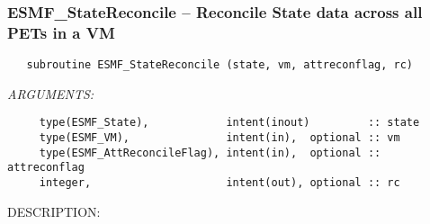  
\setlength{\oldparskip}{\parskip}
\setlength{\parskip}{1.5ex}
\setlength{\oldparindent}{\parindent}
\setlength{\parindent}{0pt}
\setlength{\oldbaselineskip}{\baselineskip}
\setlength{\baselineskip}{11pt}
 
\def\bv{\begin{verbatim}}
\def\ev{\end{verbatim}}
\def\be{\begin{equation}}
\def\ee{\end{equation}}
\def\bea{\begin{eqnarray}}
\def\eea{\end{eqnarray}}
\def\bi{\begin{itemize}}
\def\ei{\end{itemize}}
\def\bn{\begin{enumerate}}
\def\en{\end{enumerate}}
\def\bd{\begin{description}}
\def\ed{\end{description}}
\def\({\left (}
\def\){\right )}
\def\[{\left [}
\def\]{\right ]}
\def\<{\left  \langle}
\def\>{\right \rangle}
\def\cI{{\cal I}}
\def\diag{\mathop{\rm diag}}
\def\tr{\mathop{\rm tr}}


 
\subsubsection [ESMF\_StateReconcile] {ESMF\_StateReconcile -- Reconcile State data across all PETs in a VM}


  
\begin{verbatim}   subroutine ESMF_StateReconcile (state, vm, attreconflag, rc)\end{verbatim}{\em ARGUMENTS:}
\begin{verbatim}     type(ESMF_State),            intent(inout)         :: state
     type(ESMF_VM),               intent(in),  optional :: vm
     type(ESMF_AttReconcileFlag), intent(in),  optional :: attreconflag
     integer,                     intent(out), optional :: rc\end{verbatim}
{\sf DESCRIPTION:\\ }


